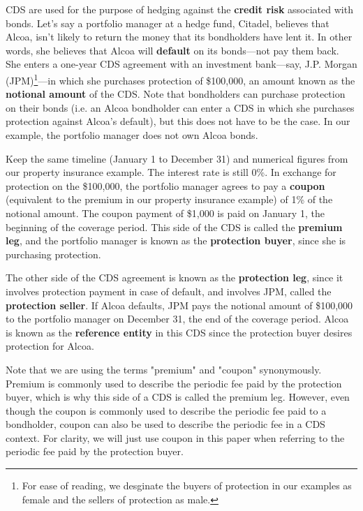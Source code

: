 \documentclass[article]{jss}
\begin{document}
CDS are used for the purpose of hedging against the \textbf{credit risk} associated with bonds. Let's say a portfolio manager at a hedge fund, Citadel, believes that Alcoa, isn't likely to return the money that its bondholders have lent it. In other words, she believes that Alcoa will \textbf{default} on its bonds---not pay them back. She enters a one-year CDS agreement with an investment bank---say, J.P. Morgan (JPM)\footnote{For ease of reading, we desginate the buyers of protection in our examples as female and the sellers of protection as male.}---in which she purchases protection of \$100,000, an amount known as the \textbf{notional amount} of the CDS. Note that bondholders can purchase protection on their bonds (i.e. an Alcoa bondholder can enter a CDS in which she purchases protection against Alcoa's default), but this does not have to be the case. In our example, the portfolio manager does not own Alcoa bonds. 

Keep the same timeline (January 1 to December 31) and numerical figures from our property insurance example. The interest rate is still 0\%. In exchange for protection on the \$100,000, the portfolio manager agrees to pay a \textbf{coupon} (equivalent to the premium in our property insurance example) of 1\% of the notional amount. The coupon payment of \$1,000 is paid on January 1, the beginning of the coverage period. This side of the CDS is called the \textbf{premium leg}, and the portfolio manager is known as the \textbf{protection buyer}, since she is purchasing protection.

The other side of the CDS agreement is known as the \textbf{protection leg}, since it involves protection payment in case of default, and involves JPM, called the \textbf{protection seller}. If Alcoa defaults, JPM pays the notional amount of \$100,000 to the portfolio manager on December 31, the end of the coverage period. Alcoa is known as the \textbf{reference entity} in this CDS since the protection buyer desires protection for Alcoa. 

Note that we are using the terms "premium" and "coupon" synonymously. Premium is commonly used to describe the periodic fee paid by the protection buyer, which is why this side of a CDS is called the premium leg. However, even though the coupon is commonly used to describe the periodic fee paid to a bondholder, coupon can also be used to describe the periodic fee in a CDS context. For clarity, we will just use coupon in this paper when referring to the periodic fee paid by the protection buyer.
\end{document}
